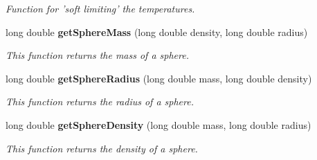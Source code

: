 \begin{CompactItemize}
\begin{CompactList}\small\item\em Function for 'soft limiting' the temperatures. \item\end{CompactList}\item 
long double {\bf get\-Sphere\-Mass} (long double density, long double radius)
\begin{CompactList}\small\item\em This function returns the mass of a sphere. \item\end{CompactList}\item 
long double {\bf get\-Sphere\-Radius} (long double mass, long double density)
\begin{CompactList}\small\item\em This function returns the radius of a sphere. \item\end{CompactList}\item 
long double {\bf get\-Sphere\-Density} (long double mass, long double radius)
\begin{CompactList}\small\item\em This function returns the density of a sphere. \item\end{CompactList}\end{CompactItemize}
